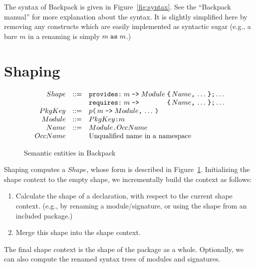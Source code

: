 \documentclass{article}
\begin{document}
The syntax of Backpack is given in Figure~\ref{fig:syntax}.
See the ``Backpack manual'' for more explanation about the syntax.  It
is slightly simplified here by removing any constructs which are easily implemented as
syntactic sugar (e.g., a bare $m$ in a renaming is simply $m\; \verb|as|\; m$.)

\newpage
\section{Shaping}

\begin{figure}[htpb]
$$
\begin{array}{rcll}
Shape & ::= & \verb|provides:|\; m \; \verb|->|\; Module\; \verb|{|\, Name \verb|,|\, \ldots \, \verb|};| \ldots \\
      &     & \verb|requires:| \; m \; \verb|->|\; \textcolor{white}{Module}\; \verb|{| \, Name \verb|,| \, \ldots \, \verb|}| \verb|;| \ldots \\
PkgKey & ::= & p \verb|(| \, m \; \verb|->| \; Module \verb|,|\, \ldots\, \verb|)| \\
Module & ::= & PkgKey \verb|:| m \\
Name   & ::= & Module \verb|.| OccName \\
OccName & & \mbox{Unqualified name in a namespace}
\end{array}
$$
\caption{Semantic entities in Backpack} \label{fig:semantic}
\end{figure}

Shaping computes a $Shape$, whose form is described in Figure~\ref{fig:semantic}.
Initializing the shape context to the empty shape, we incrementally
build the context as follows:

\begin{enumerate}
    \item Calculate the shape of a declaration, with respect to the
        current shape context.  (e.g., by renaming a module/signature,
        or using the shape from an included package.)
    \item Merge this shape into the shape context.
\end{enumerate}

The final shape context is the shape of the package as a whole.
Optionally, we can also compute the renamed syntax trees of
modules and signatures.

\end{document}
